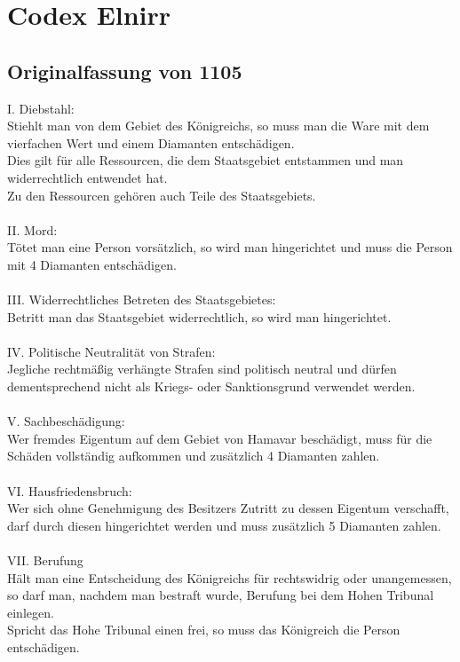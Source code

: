 \documentclass{article}
\begin{document}
\section{Codex Elnirr}
\subsection{Originalfassung von 1105}
I. Diebstahl:\\Stiehlt man von dem Gebiet des Königreichs, so muss man die Ware mit dem vierfachen Wert und einem Diamanten entschädigen.\\Dies gilt für alle Ressourcen, die dem Staatsgebiet entstammen und man widerrechtlich entwendet hat.\\Zu den Ressourcen gehören auch Teile des Staatsgebiets.
\\\\
II. Mord:\\Tötet man eine Person vorsätzlich, so wird man hingerichtet und muss die Person mit 4 Diamanten entschädigen.
\\\\
III. Widerrechtliches Betreten des Staatsgebietes:\\Betritt man das Staatsgebiet widerrechtlich, so wird man hingerichtet.
\\\\
IV. Politische Neutralität von Strafen:\\Jegliche rechtmäßig verhängte Strafen sind politisch neutral und dürfen dementsprechend nicht als Kriegs- oder Sanktionsgrund verwendet werden.
\\\\
V. Sachbeschädigung:\\Wer fremdes Eigentum auf dem Gebiet von Hamavar beschädigt, muss für die Schäden vollständig aufkommen und zusätzlich 4 Diamanten zahlen.
\\\\
VI. Hausfriedensbruch:\\Wer sich ohne Genehmigung des Besitzers Zutritt zu dessen Eigentum verschafft, darf durch diesen hingerichtet werden und muss zusätzlich 5 Diamanten zahlen.
\\\\
VII. Berufung\\Hält man eine Entscheidung des Königreichs für rechtswidrig oder unangemessen, so darf man, nachdem man bestraft wurde, Berufung bei dem Hohen Tribunal einlegen.\\Spricht das Hohe Tribunal einen frei, so muss das Königreich die Person entschädigen.
\end{document}
